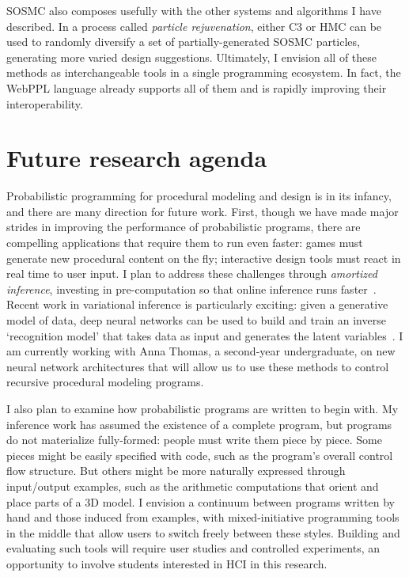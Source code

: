 \documentclass[
10pt, %
a4paper, %
oneside, %
headinclude,footinclude, %
BCOR5mm, %
]{scrartcl}
\begin{document}
SOSMC also composes usefully with the other systems and algorithms I have described. In a process called \emph{particle rejuvenation}, either C3 or HMC can be used to randomly diversify a set of partially-generated SOSMC particles, generating more varied design suggestions. Ultimately, I envision all of these methods as interchangeable tools in a single programming ecosystem. In fact, the WebPPL language already supports all of them and is rapidly improving their interoperability.



\section*{Future research agenda}

Probabilistic programming for procedural modeling and design is in its infancy, and there are many direction for future work. First, though we have made major strides in improving the performance of probabilistic programs, there are compelling applications that require them to run even faster: games must generate new procedural content on the fly; interactive design tools must react in real time to user input. I plan to address these challenges through \emph{amortized inference}, investing in pre-computation so that online inference runs faster~\cite{AmortizedInference}. Recent work in variational inference is particularly exciting: given a generative model of data, deep neural networks can be used to build and train an inverse `recognition model' that takes data as input and generates the latent variables~\cite{StochasticBackprop}.
I am currently working with Anna Thomas, a second-year undergraduate, on new neural network architectures that will allow us to use these methods to control recursive procedural modeling programs.

I also plan to examine how probabilistic programs are written to begin with. My inference work has assumed the existence of a complete program, but programs do not materialize fully-formed: people must write them piece by piece. Some pieces might be easily specified with code, such as the program's overall control flow structure. But others might be more naturally expressed through input/output examples, such as the arithmetic computations that orient and place parts of a 3D model. I envision a continuum between programs written by hand and those induced from examples, with mixed-initiative programming tools in the middle that allow users to switch freely between these styles. Building and evaluating such tools will require user studies and controlled experiments, an opportunity to involve students interested in HCI in this research.
\end{document}

